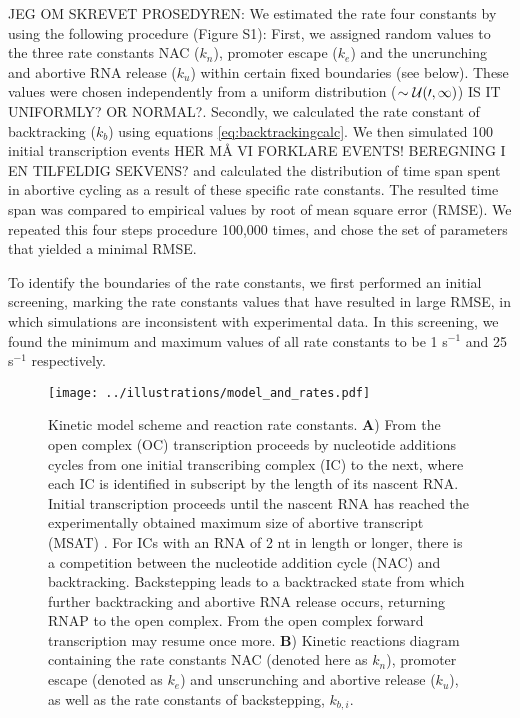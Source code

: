 JEG OM SKREVET PROSEDYREN: We estimated the rate four constants by using the
following procedure (Figure S1): First, we assigned random values to the three
rate constants NAC ($k_n$), promoter escape ($k_e$) and the uncrunching and
abortive RNA release ($k_u$) within certain fixed boundaries (see below).
These values were chosen independently from a uniform distribution ($\sim \cal
U (0,1)$) IS IT UNIFORMLY? OR NORMAL?. Secondly, we calculated the rate
constant of backtracking ($k_b$) using equations \ref{eq:backtrackingcalc}. We
then simulated 100 initial transcription events HER MÅ VI FORKLARE EVENTS!
BEREGNING I EN TILFELDIG SEKVENS? and calculated the distribution of time span
spent in abortive cycling as a result of these specific rate constants. The
resulted time span was compared to empirical values
\cite{revyakin_abortive_2006} by root of mean square error (RMSE). We repeated
this four steps procedure 100,000 times, and chose the set of parameters that
yielded a minimal RMSE.  

To identify the boundaries of the rate constants, we first performed an
initial screening, marking the rate constants values that have resulted in
large RMSE, in which simulations are inconsistent with experimental data. In
this screening, we found the minimum and maximum values of all rate constants
to be 1 s$^{-1}$ and 25 s$^{-1}$ respectively. 

\begin{figure}
	\begin{center}
        \texttt{[image: ../illustrations/model\_and\_rates.pdf]}
	\end{center}
    \caption{Kinetic model scheme and reaction rate constants.  \textbf{A})
    From the open complex (OC) transcription proceeds by nucleotide additions
    cycles from one initial transcribing complex (IC) to the next, where each
    IC is identified in subscript by the length of its nascent RNA. Initial
    transcription proceeds until the nascent RNA has reached the
    experimentally obtained maximum size of abortive transcript (MSAT)
    \cite{hsu_initial_2006}. For ICs with an RNA of 2 nt in length or longer, there is a
    competition between the nucleotide addition cycle (NAC) and backtracking.
    Backstepping leads to a backtracked state from which further backtracking
    and abortive RNA release occurs, returning RNAP to the open complex. From
    the open complex forward transcription may resume once more. \textbf{B})
    Kinetic reactions diagram containing the rate
    constants NAC (denoted here as $k_n$), promoter escape (denoted as $k_e$) and unscrunching and abortive
    release ($k_u$), as well as the rate constants of backstepping, $k_{b,i}$.}
    \label{fig:model_and_rates}
\end{figure}
